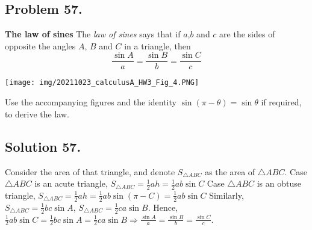 \documentclass{article}
\begin{document}
\subsection* {Problem 57.}
\textbf{The law of sines} The \textit{law of sines} says that if $a$,$b$ and $c$ are the sides of opposite the angles $A$, $B$ and $C$ in a triangle, then
\[\frac{\sin{A}}{a}=\frac{\sin{B}}{b}=\frac{\sin{C}}{c}\]
\begin{center}
    \texttt{[image: img/20211023\_calculusA\_HW3\_Fig\_4.PNG]}
\end{center}
Use the accompanying figures and the identity
$\sin(\pi-\theta)=\sin{\theta}$ if required, to derive the law.
\subsection*{Solution 57.}
Consider the area of that triangle, and denote $S_{\triangle ABC}$ as the area of $\triangle ABC$.\newline
Case $\triangle ABC$ is an acute triangle, $S_{\triangle ABC}=\frac{1}{2}ah=\frac{1}{2}ab\sin{C}$\newline
Case $\triangle ABC$ is an obtuse triangle, $S_{\triangle ABC}=\frac{1}{2}ah=\frac{1}{2}ab\sin{(\pi-C)}=\frac{1}{2}ab\sin{C}$\newline
Similarly, $S_{\triangle ABC}=\frac{1}{2}bc\sin{A}$, $S_{\triangle ABC}=\frac{1}{2}ca\sin{B}$.\newline
Hence, $\frac{1}{2}ab\sin{C}=\frac{1}{2}bc\sin{A}=\frac{1}{2}ca\sin{B}\Rightarrow \frac{\sin{A}}{a}=\frac{\sin{B}}{b}=\frac{\sin{C}}{c}$.
\end{document}
